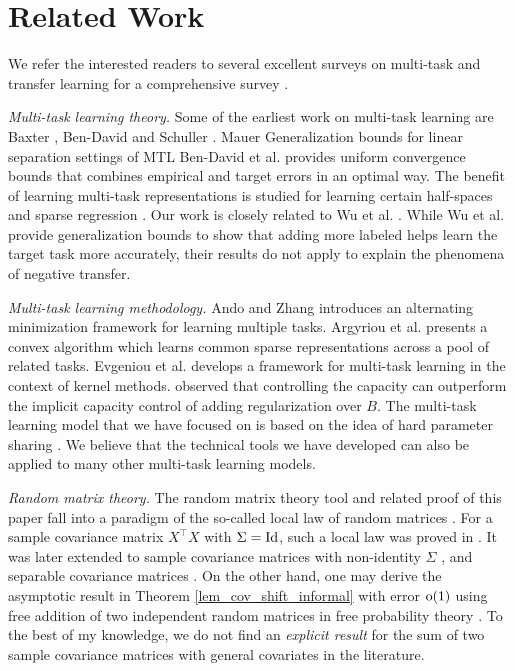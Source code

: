 \section{Related Work}


We refer the interested readers to several excellent surveys on multi-task and transfer learning for a comprehensive survey \cite{PY09,R17,ZY17,V20}.

\textit{Multi-task learning theory.}
Some of the earliest work on multi-task learning are Baxter \cite{B00}, Ben-David and Schuller \cite{BS03}.
Mauer \cite{M06} Generalization bounds for linear separation settings of MTL
Ben-David et al. \cite{BBCK10} provides uniform convergence bounds that combines empirical and target errors in an optimal way.
The benefit of learning multi-task representations is studied for learning certain half-spaces \cite{MPR16} and sparse regression \cite{LPTV09,LPVT11}.
Our work is closely related to Wu et al. \cite{WZR20}.
While Wu et al. provide generalization bounds to show that adding more labeled helps learn the target task more accurately, their results do not apply to explain the phenomena of negative transfer.

\textit{Multi-task learning methodology.}
Ando and Zhang \cite{AZ05} introduces an alternating minimization framework for learning multiple tasks.
Argyriou et al. \cite{AEP08} presents a convex algorithm which learns common sparse representations across a pool of related tasks.
Evgeniou et al. \cite{EMP05} develops a framework for multi-task learning in the context of kernel methods.
\cite{KD12} observed that controlling the capacity can outperform the implicit capacity control of adding regularization over $B$.
The multi-task learning model that we have focused on is based on the idea of hard parameter sharing \cite{C93,R17}.
We believe that the technical tools we have developed can also be applied to many other multi-task learning models.

\textit{Random matrix theory.} The random matrix theory tool and related proof of this paper fall into a paradigm of the so-called local law of random matrices \cite{erdos2017dynamical}. For a sample covariance matrix $X^\top X$ with $\Sigma=\operatorname{Id}$, such a local law was proved in \cite{isotropic}. It was later extended to sample covariance matrices with non-identity $\Sigma$ \cite{Anisotropic}, and separable covariance matrices \cite{yang2019spiked}. On the other hand, one may derive the asymptotic result in Theorem \ref{lem_cov_shift_informal} with error $\operatorname{o}(1)$ using free addition of two independent random matrices in free probability theory \cite{nica2006lectures}. To the best of my knowledge, we do not find an {\it explicit result} for the sum of two sample covariance matrices with general covariates in the literature.



